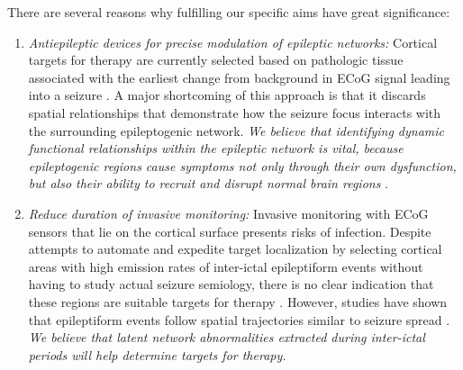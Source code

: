 There are several reasons why fulfilling our specific aims have great significance:
\begin{enumerate}
    \item \textit{Antiepileptic devices for precise modulation of epileptic networks:} Cortical targets for therapy are currently selected based on pathologic tissue associated with the earliest change from background in ECoG signal leading into a seizure \cite{litt2001epileptic}. A major shortcoming of this approach is that it discards spatial relationships that demonstrate how the seizure focus interacts with the surrounding epileptogenic network. \textit{We believe that identifying dynamic functional relationships within the epileptic network is vital, because epileptogenic regions cause symptoms not only through their own dysfunction, but also their ability to recruit and disrupt normal brain regions} \cite{kutsy1999ictal, spencer2002neural}.
    
    \item \textit{Reduce duration of invasive monitoring:} Invasive monitoring with ECoG sensors that lie on the cortical surface presents risks of infection. Despite attempts to automate and expedite target localization by selecting cortical areas with high emission rates of inter-ictal epileptiform events without having to study actual seizure semiology, there is no clear indication that these regions are suitable targets for therapy . However, studies have shown that epileptiform events follow spatial trajectories similar to seizure spread \cite{alarcon1997origin, lai2007cortical, wilke2009identification}. \textit{We believe that latent network abnormalities extracted during inter-ictal periods will help determine targets for therapy.}
\end{enumerate}


    


